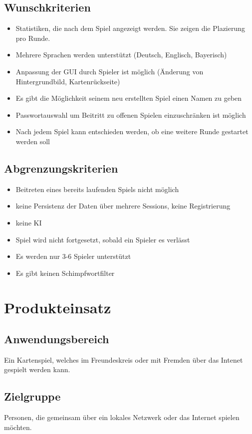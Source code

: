 \documentclass{article}
\begin{document}
\subsection{Wunschkriterien}
\begin{itemize}
	\item Statistiken, die nach dem Spiel angezeigt werden. Sie zeigen die Plazierung pro Runde.
	\item Mehrere Sprachen werden unterstützt (Deutsch, Englisch, Bayerisch)
	\item Anpassung der GUI durch Spieler ist möglich (Änderung von Hintergrundbild, Kartenrückseite)
	\item Es gibt die Möglichkeit seinem neu erstellten Spiel einen Namen zu geben
	\item Passwortauswahl um Beitritt zu offenen Spielen einzuschränken ist möglich
	\item Nach jedem Spiel kann entschieden werden, ob eine weitere Runde gestartet werden soll
\end{itemize}

\subsection{Abgrenzungskriterien}
\begin{itemize}
	\item Beitreten eines bereits laufenden Spiels nicht möglich
	\item keine Persistenz der Daten über mehrere Sessions, keine Registrierung
	\item keine KI
	\item Spiel wird nicht fortgesetzt, sobald ein Spieler es verlässt
	\item Es werden nur 3-6 Spieler unterstützt
	\item Es gibt keinen Schimpfwortfilter
\end{itemize}

\section{Produkteinsatz}
\subsection{Anwendungsbereich}
Ein Kartenspiel, welches im Freundeskreis oder mit Fremden über das Intenet gespielt werden kann.
\subsection{Zielgruppe}
Personen, die gemeinsam über ein lokales Netzwerk oder das Internet spielen möchten. 
\end{document}
